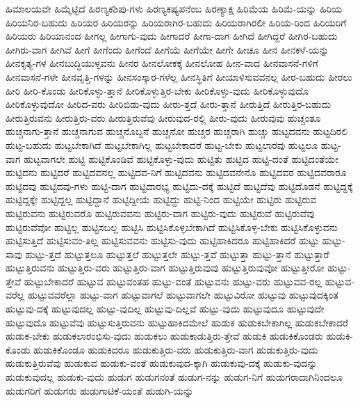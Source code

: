 {ಹಿಮಾಲಯವೇ
ಹಿಮ್ಮೆಟ್ಟಿದೆ
ಹಿರಣ್ಯಕಶಿಪು-ಗಳು
ಹಿರಣ್ಯಕಷ್ಯಪನೆಂಬ
ಹಿರಣ್ಯಾಕ್ಷ
ಹಿರಿಮೆಯ
ಹಿರಿಮೆ-ಯನ್ನು
ಹಿರಿಯ
ಹಿರಿಯನಿರ-ಬಹುದು
ಹಿರಿಯರ
ಹಿರಿಯರನ್ನು
ಹಿರಿಯರಾಗಿರ-ಬಹುದು
ಹಿರಿಯರಾಗಿರಲೀ
ಹಿರಿಯ-ರಿಂದ
ಹಿರಿಯರಿಗೆ
ಹಿರಿಯರು
ಹಿರಿಯಾನಂದ
ಹೀಗಲ್ಲ
ಹೀಗಾಗು-ವುದು
ಹೀಗಾದರೆ
ಹೀಗಾ-ದಾಗ
ಹೀಗಿದೆ
ಹೀಗಿದ್ದರೆ
ಹೀಗಿರ-ಬಹುದು
ಹೀಗಿರು-ವಾಗ
ಹೀಗಿವೆ
ಹೀಗೆ
ಹೀಗೆಂದು
ಹೀಗೆಂದೆ
ಹೀಗೆಯೆ
ಹೀಗೆಯೇ
ಹೀಗೇ
ಹೀಚೂ
ಹೀನ
ಹೀನಕಳೆ-ಯನ್ನು
ಹೀನಕೃತ್ಯ-ಗಳ
ಹೀನಬುದ್ಧಿಯುಳ್ಳವನು
ಹೀನರ
ಹೀನಲೋಕಕ್ಕೆ
ಹೀನಲೋಹ
ಹೀನ-ವಾದ
ಹೀನವಾಸನೆ-ಗಳಿಗೆ
ಹೀನವಾಸನೆ-ಗಳೇ
ಹೀನವೃತ್ತಿ-ಗಳನ್ನು
ಹೀನಸಂಸ್ಕಾರ-ಗಳೆಲ್ಲ
ಹೀನಸ್ಥಿತಿಗೆ
ಹೀಯಾಳಿಸುವವನಲ್ಲ
ಹೀರ-ಬಹುದು
ಹೀರಲು
ಹೀರಿ
ಹೀರಿ-ಕೊಂಡು
ಹೀರಿಕೊಳ್ಳು-ತ್ತಾನೆ
ಹೀರಿಕೊಳ್ಳುತ್ತಿರ-ಬೇಕು
ಹೀರಿಕೊಳ್ಳು-ವುದು
ಹೀರಿಕೊಳ್ಳುವುದೊ
ಹೀರಿಕೊಳ್ಳುವುದೋ
ಹೀರಿದ-ವರು
ಹೀರಿಬಿಡು-ವುದು
ಹೀರು-ತ್ತದೆ
ಹೀರು-ತ್ತಾನೆ
ಹೀರುತ್ತಿದೆ
ಹೀರುತ್ತಿರ-ಬಹುದು
ಹೀರುತ್ತಿರುವನು
ಹೀರುತ್ತಿರು-ವರು
ಹೀರುತ್ತಿರುವೆವು
ಹೀರುವುದ-ರಲ್ಲಿ
ಹೀರು-ವುದು
ಹೀರುವುವು
ಹುಚ್ಚಂತೂ
ಹುಚ್ಚನಾಗು-ತ್ತಾನೆ
ಹುಚ್ಚನಾಗುವ
ಹುಚ್ಚನೊಬ್ಬನೆ
ಹುಚ್ಚನೋ
ಹುಚ್ಚರ
ಹುಚ್ಚರಾಗಿ
ಹುಚ್ಚು
ಹುಟ್ಟದವನು
ಹುಟ್ಟದಿರಲಿ
ಹುಟ್ಟ-ಬಹುದು
ಹುಟ್ಟಬೇಕಾಗಿದೆ
ಹುಟ್ಟಬೇಕಾಗಿಲ್ಲ
ಹುಟ್ಟಬೇಕಾದರೆ
ಹುಟ್ಟ-ಬೇಕು
ಹುಟ್ಟಲಾರವು
ಹುಟ್ಟಲೂ
ಹುಟ್ಟ-ವಾಗ
ಹುಟ್ಟವಾಗಲೇ
ಹುಟ್ಟಿ
ಹುಟ್ಟಿಕೊಂಡಿವೆ
ಹುಟ್ಟಿಕೊಳ್ಳು-ವುದು
ಹುಟ್ಟಿತು
ಹುಟ್ಟಿದ
ಹುಟ್ಟಿ-ದಂತೆ
ಹುಟ್ಟಿದಂತೆಯೇ
ಹುಟ್ಟಿದನು
ಹುಟ್ಟಿದರೆ
ಹುಟ್ಟಿದವನಲ್ಲ
ಹುಟ್ಟಿದವ-ನಿಗೆ
ಹುಟ್ಟಿದವನು
ಹುಟ್ಟಿದವನೇನೊ
ಹುಟ್ಟಿದವರ
ಹುಟ್ಟಿದವರಾರೂ
ಹುಟ್ಟಿದವು
ಹುಟ್ಟಿದವು-ಗಳು
ಹುಟ್ಟಿ-ದಾಗ
ಹುಟ್ಟಿದಾರಭ್ಯ
ಹುಟ್ಟಿದು-ದಕ್ಕೆ
ಹುಟ್ಟಿದೆ
ಹುಟ್ಟಿದೆವು
ಹುಟ್ಟಿದೊಡನೆ
ಹುಟ್ಟಿದ್ದಕ್ಕೆ
ಹುಟ್ಟಿದ್ದಕ್ಕೇ
ಹುಟ್ಟಿದ್ದಲ್ಲ
ಹುಟ್ಟಿದ್ದಾನೆ
ಹುಟ್ಟಿದ್ದೀಯೆ
ಹುಟ್ಟಿದ್ದು
ಹುಟ್ಟಿ-ನಿಂದ
ಹುಟ್ಟಿಯೇ
ಹುಟ್ಟಿರು
ಹುಟ್ಟಿರುವ
ಹುಟ್ಟಿರುವನು
ಹುಟ್ಟಿರುವರೊ
ಹುಟ್ಟಿರುವವನು
ಹುಟ್ಟಿರು-ವಾಗ
ಹುಟ್ಟಿರು-ವುದು
ಹುಟ್ಟಿರುವೆ
ಹುಟ್ಟಿರುವೆವು
ಹುಟ್ಟಿರುವೆವೋ
ಹುಟ್ಟಿಲ್ಲ
ಹುಟ್ಟಿಸಬಲ್ಲ
ಹುಟ್ಟಿಸಿ
ಹುಟ್ಟಿಸಿಕೊಳ್ಳಬೇಕಾಗಿದೆ
ಹುಟ್ಟಿಸಿಕೊಳ್ಳ-ಬೇಕು
ಹುಟ್ಟಿಸಿಕೊಳ್ಳುವನು
ಹುಟ್ಟಿಸುತ್ತಿದೆ
ಹುಟ್ಟಿಸುವಂ-ತಿಲ್ಲ
ಹುಟ್ಟಿಸುವವನು
ಹುಟ್ಟಿಸು-ವುದು
ಹುಟ್ಟಿಹಾಕಿದರೂ
ಹುಟ್ಟಿಹಾಕಿದರೆ
ಹುಟ್ಟು
ಹುಟ್ಟು-ಸಾವು
ಹುಟ್ಟು-ತ್ತದೆ
ಹುಟ್ಟುತ್ತಲೂ
ಹುಟ್ಟುತ್ತಲೆ
ಹುಟ್ಟುತ್ತಲೇ
ಹುಟ್ಟು-ತ್ತವೆ
ಹುಟ್ಟುತ್ತಾ
ಹುಟ್ಟು-ತ್ತಾನೆ
ಹುಟ್ಟುತ್ತಾರೆ
ಹುಟ್ಟುತ್ತಿರುವನು
ಹುಟ್ಟುತ್ತಿರು-ವರು
ಹುಟ್ಟುತ್ತಿರು-ವಾಗ
ಹುಟ್ಟುತ್ತಿರುವುವು
ಹುಟ್ಟುತ್ತಿರುವುವೋ
ಹುಟ್ಟುತ್ತೀರೋ
ಹುಟ್ಟು-ತ್ತೇವೆ
ಹುಟ್ಟುಬೇಕಾದರೆ
ಹುಟ್ಟುವ
ಹುಟ್ಟುವಂತಹ
ಹುಟ್ಟು-ವಂತೆ
ಹುಟ್ಟುವನು
ಹುಟ್ಟು-ವರು
ಹುಟ್ಟುವವ-ರಲ್ಲ
ಹುಟ್ಟುವ-ವರೆಲ್ಲ
ಹುಟ್ಟುವವರೆಲ್ಲಾ
ಹುಟ್ಟು-ವಾಗ
ಹುಟ್ಟುವಾಗಲೆ
ಹುಟ್ಟುವಾಗಲೇ
ಹುಟ್ಟುವಿರೋ
ಹುಟ್ಟುವು
ಹುಟ್ಟುವುದಕ್ಕಿಂತ
ಹುಟ್ಟುವು-ದಕ್ಕೆ
ಹುಟ್ಟುವುದಲ್ಲ
ಹುಟ್ಟು-ವುದಿಲ್ಲ
ಹುಟ್ಟುವು-ದಿಲ್ಲವೆ
ಹುಟ್ಟು-ವುದು
ಹುಟ್ಟುವುದೂ
ಹುಟ್ಟುವುದೇ
ಹುಟ್ಟುವುದೊ
ಹುಟ್ಟುವೆವು
ಹುಟ್ಟುಸುತ್ತಿರುವನು
ಹುಟ್ಟುಹಾಕಿದಮೇಲೆ
ಹುಡುಕ
ಹುಡುಕಬೇಕಾಗಿಲ್ಲ
ಹುಡುಕಬೇಕಾದರೆ
ಹುಡುಕ-ಬೇಕು
ಹುಡುಕಲಾರಂಭಿಸು-ವುದು
ಹುಡುಕಲು
ಹುಡುಕಾಡುತ್ತಿರು-ತ್ತೇವೆ
ಹುಡುಕಿ
ಹುಡುಕಿಕೊಂಡರು
ಹುಡುಕಿ-ಕೊಂಡು
ಹುಡುಕಿಕೊಂಡೂ
ಹುಡುಕಿದರೂ
ಹುಡುಕುತ್ತಿರು-ವರು
ಹುಡುಕುತ್ತಿರು-ವಾಗ
ಹುಡುಕುತ್ತಿರು-ವುದು
ಹುಡುಕುತ್ತಿರುವೆವು
ಹುಡುಕುವ
ಹುಡುಕು-ವಂತೆ
ಹುಡುಕುವುದ-ಕ್ಕಾಗಿ
ಹುಡುಕುವು-ದಕ್ಕೆ
ಹುಡುಕು-ವುದನ್ನು
ಹುಡುಕುವುದಲ್ಲ
ಹುಡುಕು-ವುದು
ಹುಡುಗ
ಹುಡುಗನಂತೆ
ಹುಡುಗ-ನನ್ನು
ಹುಡುಗ-ನಿಗೆ
ಹುಡುಗರಾದಾಗಿನಿಂದಲೂ
ಹುಡುಗರಿಗೆ
ಹುಡುಗರು
ಹುಡುಗಾಟಿಕೆ-ಯಂತೆ
ಹುಡುಗಿ-ಯನ್ನು
}
